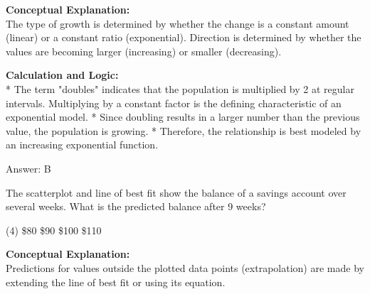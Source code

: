 \documentclass[11pt,paper=a4,answers]{exam}
\begin{document}
\begin{questions}
\begin{solution}
\textbf{Conceptual Explanation:} \\
The type of growth is determined by whether the change is a constant amount (linear) or a constant ratio (exponential). Direction is determined by whether the values are becoming larger (increasing) or smaller (decreasing).

\vspace{30pt}

\textbf{Calculation and Logic:} \\
* The term "doubles" indicates that the population is multiplied by 2 at regular intervals. Multiplying by a constant factor is the defining characteristic of an exponential model.
* Since doubling results in a larger number than the previous value, the population is growing.
* Therefore, the relationship is best modeled by an increasing exponential function.

\vspace{30pt}

Answer: \colorbox{yellow!100}{B}
\end{solution}

\vspace{60pt}

\question
\begin{center}
\end{center}
The scatterplot and line of best fit show the balance of a savings account over several weeks. What is the predicted balance after 9 weeks?
\begin{tasks}(4)
    \task \$80
    \task \$90
    \task \$100
    \task \$110
\end{tasks}

\begin{solution}
\textbf{Conceptual Explanation:} \\
Predictions for values outside the plotted data points (extrapolation) are made by extending the line of best fit or using its equation.


\end{solution}
\end{questions}
\end{document}
